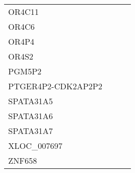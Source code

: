 \begin{tabular}{lccc}
OR4C11             &     &     &         \\
OR4C6              &     &     &         \\
OR4P4              &     &     &         \\
OR4S2              &     &     &         \\
PGM5P2             &     &     &         \\
PTGER4P2-CDK2AP2P2 &     &     &         \\
SPATA31A5          &     &     &         \\
SPATA31A6          &     &     &         \\
SPATA31A7          &     &     &         \\
XLOC\_007697        &     &     &         \\
ZNF658             &     &     &         \\
\bottomrule
\end{tabular}
